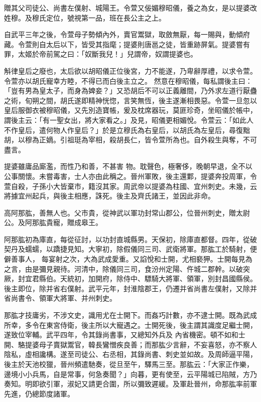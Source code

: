 \begin{pinyinscope}
 贈其父司徒公、尚書左僕射、城陽王。令萱又佞媚穆昭儀，養之為女，是以提婆改姓穆。及穆氏定位，號視第一品，班在長公主之上。



 自武平三年之後，令萱母子勢傾內外，賣官鬻獄，取斂無厭，每一賜與，動傾府藏。令萱則自太后以下，皆受其指麾；提婆則唐邕之徒，皆重跡屏氣。提婆嘗有罪，太姬於帝前駕之曰：「奴斷我兒！」兒謂帝，奴謂提婆也。



 斛律皇后之廢也，太后欲以胡昭儀正位後宮，力不能遂，乃卑辭厚禮，以求令萱。令萱亦以胡氏寵幸方睦，不得已而白後主立之。
 然意在穆昭儀，每私謂後主曰：「豈有男為皇太子，而身為婢妾？」又恐胡后不可以正義離間，乃外求左道行厭蠱之術，旬朔之間，胡氏遂即精神恍惚，言笑無恆，後主遂漸相畏惡。令萱一旦忽以皇后服御衣被穆昭儀，又先別造寶帳，爰及枕席器玩，莫匪珍奇，坐昭儀於帳中，謂後主云：「有一聖女出，將大家看之。」及見，昭儀更相媚悅。令萱云：「如此人不作皇后，遣何物人作皇后？」於是立穆氏為右皇后，以胡氏為左皇后，尋復黜胡，以穆為正嫡。引祖珽為宰相，殺胡長仁，皆令萱所為也。自外殺生與奪，不可盡言。



 提婆雖庸品廝濫，而性乃和善，不甚害
 物。耽聲色，極奢侈，晚朝早退，全不以公事關懷。未嘗毒害，士人亦由此稱之。晉州軍敗，後主還鄴，提婆奔投周軍，令萱自殺，子孫小大皆棄市，籍沒其家。周武帝以提婆為柱國、宜州刺史。未幾，云將據宜州起兵，與後主相應，誅死。後主及齊氏諸王，並因此非命。



 高阿那肱，善無人也。父市貴，從神武以軍功封常山郡公，位晉州刺史，贈太尉公。及阿那肱貴寵，贈成皋王。



 阿那肱初為庫直，每從征討，以功封直城縣男。天保初，除庫直都督。四年，從破契丹及蠕蠕，以蹻捷見知。大寧初，除假儀同三司、武衛將軍。那肱工於騎射，便僻善事人，
 每宴射之次，大為武成愛重。又諂悅和士開，尤相褻狎。士開每見為之言，由是彌見親待。河清中，除儀同三司，食汾州定陽、仵城二郡幹。以破突厥，封宜君縣伯。天統初，加開府，除侍中、驃騎大將軍、領軍，別封昌國縣侯。後主即位，除并省右僕射。武平元年，封淮陰郡王，仍遷并省尚書左僕射，又除并省尚書令、領軍大將軍、并州刺史。



 那肱才技庸劣，不涉文史，識用尤在士開下。而姦巧計數，亦不逮士開。既為武成所幸，多令在東宮侍衛，後主所以大寵遇之。士開死後，後主謂其識度足繼士開，遂致位宰輔。武平四年，令其錄尚書事，又總知外兵及
 內省機密。頓不如和士開、駱提婆母子賣獄鬻官，韓長鸞憎疾良善；而那肱少言辭，不妄喜怒，亦不察人陰私，虛相讒構。遂至司徒公、右丞相，其錄尚書、刺史並如故。及周師逼平陽，後主於天池校獵，晉州頻遣馳奏，從旦至午，驛馬三至。那肱云：「大家正作樂，邊境小小兵馬，自是常事，何急奏聞？」向暮，更有使至，云平陽城已陷賊，方乃奏知。明即欲引軍，淑妃又請更合圍，所以彌致遲緩。及軍赴晉州，命那肱率前軍先進，仍總節度諸軍。




\end{pinyinscope}
